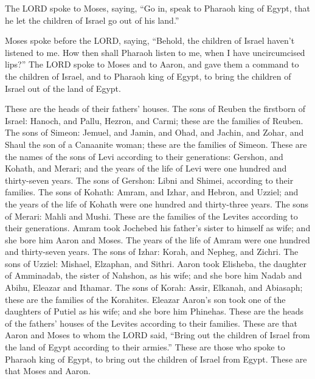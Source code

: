  The LORD spoke to Moses, saying,  ``Go in,
speak to Pharaoh king of Egypt, that he let the children of Israel go
out of his land.''

 Moses spoke before the LORD, saying, ``Behold, the
children of Israel haven't listened to me. How then shall Pharaoh listen
to me, when I have uncircumcised lips?''  The LORD spoke to
Moses and to Aaron, and gave them a command to the children of Israel,
and to Pharaoh king of Egypt, to bring the children of Israel out of the
land of Egypt.

 These are the heads of their fathers' houses. The sons of
Reuben the firstborn of Israel: Hanoch, and Pallu, Hezron, and Carmi;
these are the families of Reuben.  The sons of Simeon:
Jemuel, and Jamin, and Ohad, and Jachin, and Zohar, and Shaul the son of
a Canaanite woman; these are the families of Simeon.  These
are the names of the sons of Levi according to their generations:
Gershon, and Kohath, and Merari; and the years of the life of Levi were
one hundred and thirty-seven years.  The sons of Gershon:
Libni and Shimei, according to their families.  The sons of
Kohath: Amram, and Izhar, and Hebron, and Uzziel; and the years of the
life of Kohath were one hundred and thirty-three years. 
The sons of Merari: Mahli and Mushi. These are the families of the
Levites according to their generations.  Amram took
Jochebed his father's sister to himself as wife; and she bore him Aaron
and Moses. The years of the life of Amram were one hundred and
thirty-seven years.  The sons of Izhar: Korah, and Nepheg,
and Zichri.  The sons of Uzziel: Mishael, Elzaphan, and
Sithri.  Aaron took Elisheba, the daughter of Amminadab,
the sister of Nahshon, as his wife; and she bore him Nadab and Abihu,
Eleazar and Ithamar.  The sons of Korah: Assir, Elkanah,
and Abiasaph; these are the families of the Korahites. 
Eleazar Aaron's son took one of the daughters of Putiel as his wife; and
she bore him Phinehas. These are the heads of the fathers' houses of the
Levites according to their families.  These are that Aaron
and Moses to whom the LORD said, ``Bring out the children of Israel from
the land of Egypt according to their armies.''  These are
those who spoke to Pharaoh king of Egypt, to bring out the children of
Israel from Egypt. These are that Moses and Aaron.


